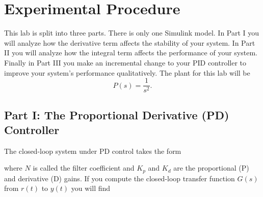 \section{Experimental Procedure}\label{Lab:4:Experiment}
This lab is split into three parts.
There is only one Simulink model.
In Part I you will analyze how the derivative term affects the stability of your system.
In Part II you will analyze how the integral term affects the performance of your system.
Finally in Part III you make an incremental change to your PID controller to improve your system's performance qualitatively.
The plant for this lab will be
\[
  P(s) = \frac{1}{s^2}.
\]

\subsection{Part I: The Proportional Derivative (PD) Controller}
The closed-loop system under PD control takes the form
%
\begin{center}
\end{center}
where \(N\) is called the filter coefficient and \(K_p\) and \(K_d\) are the proportional (P) and derivative (D) gains.
If you compute the closed-loop transfer function \(G(s)\) from \(r(t)\) to \(y(t)\) you will find
